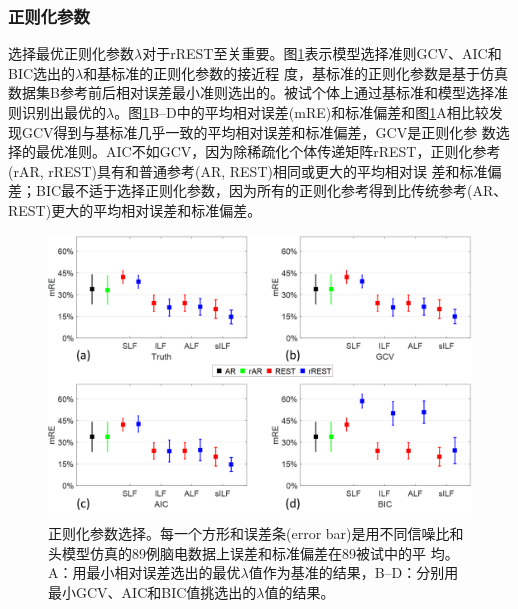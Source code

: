 \subsubsection{正则化参数}
选择最优正则化参数$\lambda$对于rREST至关重要。图\ref{3.6}表示模型选择准则GCV、AIC和BIC选出的$\lambda$和基标准的正则化参数的接近程
度，基标准的正则化参数是基于仿真数据集B参考前后相对误差最小准则选出的。被试个体上通过基标准和模型选择准则识别出最优的$\lambda$。图\ref{3.6}B–D中的平均相对误差(mRE)和标准偏差和图\ref{3.6}A相比较发现GCV得到与基标准几乎一致的平均相对误差和标准偏差，GCV是正则化参
数选择的最优准则。AIC不如GCV，因为除稀疏化个体传递矩阵rREST，正则化参考(rAR, rREST)具有和普通参考(AR, REST)相同或更大的平均相对误
差和标准偏差；BIC最不适于选择正则化参数，因为所有的正则化参考得到比传统参考(AR、REST)更大的平均相对误差和标准偏差。
\begin{figure}[!h]
	\centering
	\includegraphics[width=15cm]{pic/Frontier/figure6.png}
	\caption{正则化参数选择。每一个方形和误差条(error bar)是用不同信噪比和头模型仿真的89例脑电数据上误差和标准偏差在89被试中的平
	均。A：用最小相对误差选出的最优$\lambda$值作为基准的结果，B–D：分别用最小GCV、AIC和BIC值挑选出的$\lambda$值的结果。}
	\label{3.6}
\end{figure}

